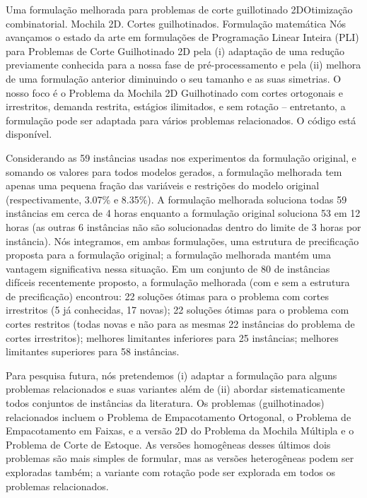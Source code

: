 \documentclass[ppgc,prop-tese,english,formais,babel]{iiufrgs}
\begin{document}
\begin{englishabstract}{Uma formulação melhorada para problemas de corte guillotinado 2D}{Otimização combinatorial. Mochila 2D. Cortes guilhotinados. Formulação matemática}
Nós avançamos o estado da arte em formulações de Programação Linear Inteira (PLI) para Problemas de Corte Guilhotinado 2D pela (i) adaptação de uma redução previamente conhecida para a nossa fase de pré-processamento e pela (ii) melhora de uma formulação anterior diminuindo o seu tamanho e as suas simetrias.
O nosso foco é o Problema da Mochila 2D Guilhotinado com cortes ortogonais e irrestritos, demanda restrita, estágios ilimitados, e sem rotação -- entretanto, a formulação pode ser adaptada para vários problemas relacionados.
O código está disponível.

Considerando as 59 instâncias usadas nos experimentos da formulação original, e somando os valores para todos modelos gerados, a formulação melhorada tem apenas uma pequena fração das variáveis e restrições do modelo original (respectivamente, 3.07\% e 8.35\%).
A formulação melhorada soluciona todas 59 instâncias em cerca de 4 horas enquanto a formulação original soluciona 53 em 12 horas (as outras 6 instâncias não são solucionadas dentro do limite de 3 horas por instância).
Nós integramos, em ambas formulações, uma estrutura de precificação proposta para a formulação original; a formulação melhorada mantém uma vantagem significativa nessa situação.
Em um conjunto de 80 de instâncias difíceis recentemente proposto, a formulação melhorada (com e sem a estrutura de precificação) encontrou: 22 soluções ótimas para o problema com cortes irrestritos (5 já conhecidas, 17 novas); 22 soluções ótimas para o problema com cortes restritos (todas novas e não para as mesmas 22 instâncias do problema de cortes irrestritos); melhores limitantes inferiores para 25 instâncias; melhores limitantes superiores para 58 instâncias.

Para pesquisa futura, nós pretendemos (i) adaptar a formulação para alguns problemas relacionados e suas variantes além de (ii) abordar sistematicamente todos conjuntos de instâncias da literatura.
Os problemas (guilhotinados) relacionados incluem o Problema de Empacotamento Ortogonal, o Problema de Empacotamento em Faixas, e a versão 2D do Problema da Mochila Múltipla e o Problema de Corte de Estoque.
As versões homogêneas desses últimos dois problemas são mais simples de formular, mas as versões heterogêneas podem ser exploradas também; a variante com rotação pode ser explorada em todos os problemas relacionados.
\end{englishabstract}
\end{document}

